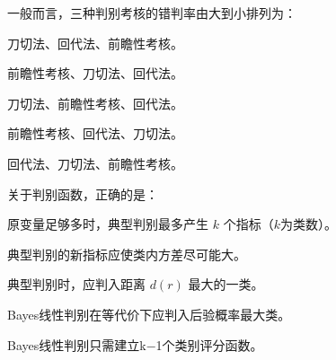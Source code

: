\par\addvspace{6pt}\noindent\begin{minipage}{\linewidth}


一般而言，三种判别考核的错判率由大到小排列为：


\begin{choices}

\item 刀切法、回代法、前瞻性考核。

\item 前瞻性考核、刀切法、回代法。

\item 刀切法、前瞻性考核、回代法。

\item 前瞻性考核、回代法、刀切法。

\item 回代法、刀切法、前瞻性考核。

\end{choices}

\end{minipage}\par\vspace{4pt}

\par\addvspace{6pt}\noindent\begin{minipage}{\linewidth}


关于判别函数，正确的是：


\begin{choices}

\item 原变量足够多时，典型判别最多产生 \(k\) 个指标（\(k\)为类数）。

\item 典型判别的新指标应使类内方差尽可能大。

\item 典型判别时，应判入距离 \(d(r)\) 最大的一类。

\item Bayes线性判别在等代价下应判入后验概率最大类。

\item Bayes线性判别只需建立k−1个类别评分函数。

\end{choices}

\end{minipage}\par\vspace{4pt}

